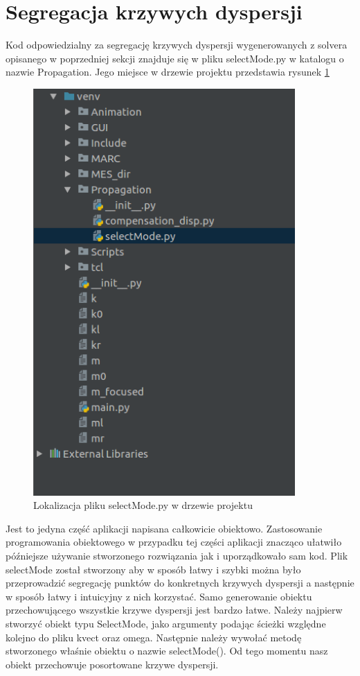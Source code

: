 \section{Segregacja krzywych dyspersji}
Kod odpowiedzialny za segregację krzywych dyspersji wygenerowanych z solvera opisanego w poprzedniej sekcji znajduje się w pliku selectMode.py w katalogu o nazwie Propagation. Jego miejsce w drzewie projektu przedstawia rysunek \ref{fig:gdzie jest select}
\begin{figure}[h]
\centering
\includegraphics[width=10cm]{Zdjecia/5/kasia/selectMode}
\caption{Lokalizacja pliku selectMode.py w drzewie projektu}
\label{fig:gdzie jest select}
\end{figure}
Jest to jedyna część aplikacji napisana całkowicie obiektowo. Zastosowanie programowania obiektowego w przypadku tej części aplikacji znacząco ułatwiło późniejsze używanie stworzonego rozwiązania jak i uporządkowało sam kod. Plik selectMode został stworzony aby w sposób łatwy i szybki można było przeprowadzić segregację punktów do konkretnych krzywych dyspersji a następnie w sposób łatwy i intuicyjny z nich korzystać. Samo generowanie obiektu przechowującego wszystkie krzywe dyspersji jest bardzo łatwe. Należy najpierw stworzyć obiekt typu SelectMode, jako argumenty podając ścieżki względne kolejno do pliku kvect oraz omega. Następnie należy wywołać metodę stworzonego właśnie obiektu o nazwie selectMode(). Od tego momentu nasz obiekt przechowuje posortowane krzywe dyspersji.

